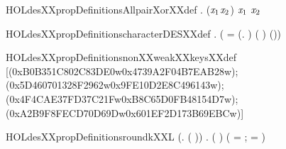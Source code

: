 \newcommand{\HOLdesXXpropDate}{24 October 2024}
\newcommand{\HOLdesXXpropTime}{01:13}
\begin{SaveVerbatim}{HOLdesXXpropDefinitionsAllpairXorXXdef}
\HOLTokenTurnstile{} \HOLSymConst{\HOLTokenForall{}}.   \HOLSymConst{=} \HOLTokenLeftbrace{}(\ensuremath{\HOLBoundVar{x}\sb{\mathrm{1}}}\HOLSymConst{,}\ensuremath{\HOLBoundVar{x}\sb{\mathrm{2}}}) \HOLTokenBar{} \ensuremath{\HOLBoundVar{x}\sb{\mathrm{1}}} \HOLSymConst{\HOLTokenEor{}} \ensuremath{\HOLBoundVar{x}\sb{\mathrm{2}}} \HOLSymConst{=} \HOLTokenRightbrace{}
\end{SaveVerbatim}
\newcommand{\HOLdesXXpropDefinitionsAllpairXorXXdef}{\UseVerbatim{HOLdesXXpropDefinitionsAllpairXorXXdef}}
\begin{SaveVerbatim}{HOLdesXXpropDefinitionscharacterDESXXdef}
\HOLTokenTurnstile{} \HOLSymConst{\HOLTokenForall{}}  .
         \HOLSymConst{=}
     (
         =  (\HOLTokenLambda{}.    ) ( )
        (\HOLSymConst{,}\HOLSymConst{,}))
\end{SaveVerbatim}
\newcommand{\HOLdesXXpropDefinitionscharacterDESXXdef}{\UseVerbatim{HOLdesXXpropDefinitionscharacterDESXXdef}}
\begin{SaveVerbatim}{HOLdesXXpropDefinitionsnonXXweakXXkeysXXdef}
\HOLTokenTurnstile{}  \HOLSymConst{=}
   [(0xB0B351C802C83DE0w\HOLSymConst{,}0x4739A2F04B7EAB28w);
    (0x5D460701328F2962w\HOLSymConst{,}0x9FE10D2E8C496143w);
    (0x4F4CAE37FD37C21Fw\HOLSymConst{,}0xB8C65D0FB48154D7w);
    (0xA2B9F8FECD70D69Dw\HOLSymConst{,}0x601EF2D173B69EBCw)]
\end{SaveVerbatim}
\newcommand{\HOLdesXXpropDefinitionsnonXXweakXXkeysXXdef}{\UseVerbatim{HOLdesXXpropDefinitionsnonXXweakXXkeysXXdef}}
\begin{SaveVerbatim}{HOLdesXXpropDefinitionsroundkXXL}
\HOLTokenTurnstile{} (\HOLSymConst{\HOLTokenForall{}}.    \HOLSymConst{=}  ( )) \HOLSymConst{\HOLTokenConj{}}
   \HOLSymConst{\HOLTokenForall{}} .
      ( )  \HOLSymConst{=}
     (  =   ;  =      \HOLSymConst{\HOLTokenRol{}} )
\end{SaveVerbatim}
